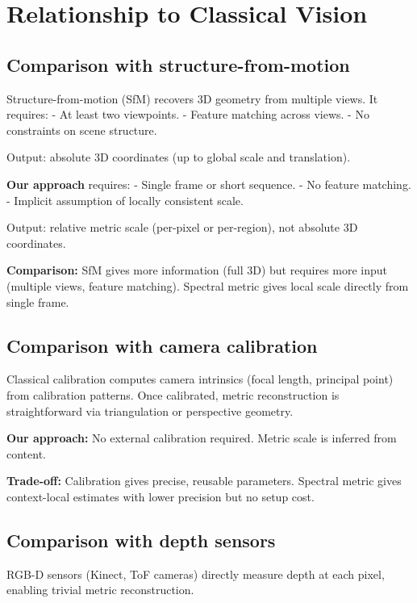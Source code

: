 \documentclass[11pt,twocolumn,a4paper]{article}
\theoremstyle{definition}
\begin{document}
\section{Relationship to Classical Vision}

\subsection{Comparison with structure-from-motion}

Structure-from-motion (SfM) recovers 3D geometry from multiple views. It requires:
- At least two viewpoints.
- Feature matching across views.
- No constraints on scene structure.

Output: absolute 3D coordinates (up to global scale and translation).

\textbf{Our approach} requires:
- Single frame or short sequence.
- No feature matching.
- Implicit assumption of locally consistent scale.

Output: relative metric scale (per-pixel or per-region), not absolute 3D coordinates.

\textbf{Comparison:} SfM gives more information (full 3D) but requires more input (multiple views, feature matching). Spectral metric gives local scale directly from single frame.

\subsection{Comparison with camera calibration}

Classical calibration computes camera intrinsics (focal length, principal point) from calibration patterns. Once calibrated, metric reconstruction is straightforward via triangulation or perspective geometry.

\textbf{Our approach:} No external calibration required. Metric scale is inferred from content.

\textbf{Trade-off:} Calibration gives precise, reusable parameters. Spectral metric gives context-local estimates with lower precision but no setup cost.

\subsection{Comparison with depth sensors}

RGB-D sensors (Kinect, ToF cameras) directly measure depth at each pixel, enabling trivial metric reconstruction.
\end{document}
